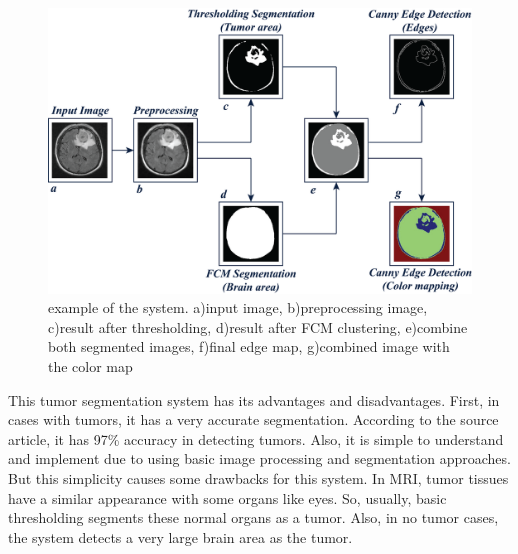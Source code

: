 \begin{figure}[H]
	\centering \includegraphics[width=0.9\columnwidth]{figures/Fig30.png}
	\caption{example of the system. a)input image, b)preprocessing image, c)result after thresholding, d)result after FCM clustering, e)combine both segmented images, f)final edge map, g)combined image with the color map}
	\label{fig30}
\end{figure}

This tumor segmentation system has its advantages and disadvantages. First, in cases with tumors, it has a very accurate segmentation. According to the source article, it has 97\% accuracy in detecting tumors. Also, it is simple to understand and implement due to using basic image processing and segmentation approaches. But this simplicity causes some drawbacks for this system. In MRI, tumor tissues have a similar appearance with some organs like eyes. So, usually, basic thresholding segments these normal organs as a tumor. Also, in no tumor cases, the system detects a very large brain area as the tumor.